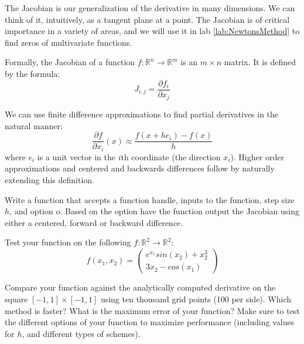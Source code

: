 \label{Ch:Multivariate Finite Difference Schemes}


The Jacobian is our generalization of the derivative in many dimensions. We can think of it, intuitively, as a tangent plane at a point. The Jacobian is of critical importance in a variety of areas, and we will use it in lab \ref{lab:NewtonsMethod} to find zeros of multivariate functions.

Formally, the Jacobian of a function $f:\mathbb{R}^n \rightarrow \mathbb{R}^m$ is an $m \times n$ matrix. It is defined by the formula:
\begin{equation*}
J_{i,j} = \frac{\partial f_i}{\partial x_j}
\end{equation*}

We can use finite difference approximations to find partial derivatives in the natural manner:
\begin{equation*}
\frac{\partial f}{\partial x_i} (x) \approx \frac{f(x+h e_i)-f(x)}{h}
\end{equation*}
where $e_i$ is a unit vector in the $i$th coordinate (the direction $x_i$). Higher order approximations and centered and backwards differences follow by naturally extending this definition.

\begin{problem}
Write a function  that accepts a function handle, inputs to the function, step size $h$, and option o. Based on the option have the function output the Jacobian using either a centered, forward or backward difference.

Test your function on the following $f: \mathbb{R}^2 \to \mathbb{R}^2$:
\begin{equation*}
f(x_1, x_2) = 
\begin{pmatrix}
e^{x_1} sin(x_2) + x_2^3 \\
3x_2 - cos(x_1)
\end{pmatrix}
\end{equation*} 

Compare your  function against the analytically computed derivative on the square $[-1,1] \times [-1,1]$ using ten thousand grid points (100 per side). Which method is faster? What is the maximum error of your function? Make sure to test the different options of your function to maximize performance (including values for $h$, and different types of schemes).
\end{problem}

